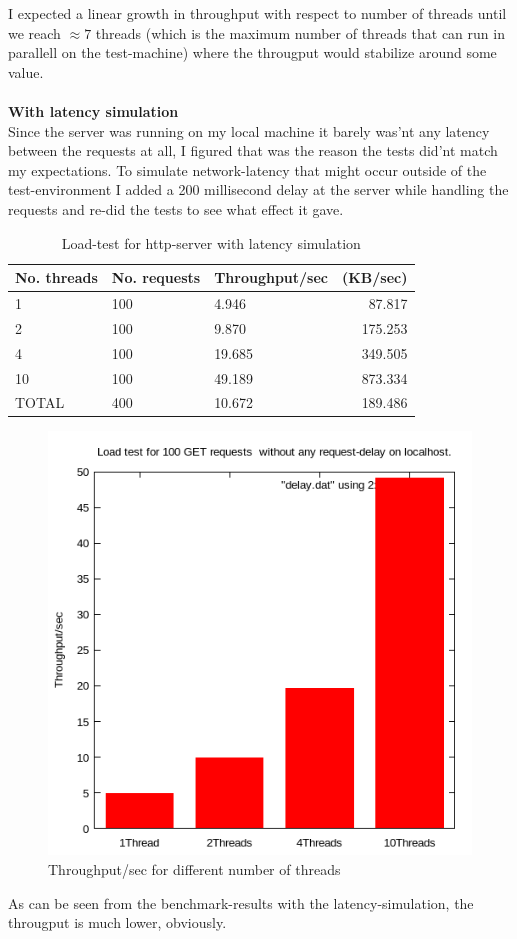 \documentclass[a4paper, 11pt]{article}
\begin{document}
I expected a linear growth in throughput with respect to number of threads until we reach $\approx 7$ threads (which is the maximum number of threads that can run in parallell on the test-machine) where the througput would stabilize around some value. \\ \\ 
\textbf{With latency simulation} \\ 
Since the server was running on my local machine it barely was'nt any latency between the requests at all, I figured that was the reason the tests did'nt match my expectations.
To simulate network-latency that might occur outside of the test-environment I added a 200 millisecond delay at the server while handling the requests and re-did the tests to see what  effect it gave.
\begin{table}[H]
\centering
\label{Load-test for http-server with latency simulation}
\begin{tabular}{|l|l|l|r|}
\hline
\textbf{No. threads}  & \textbf{No. requests}  & \textbf{Throughput/sec} & \textbf{(KB/sec)} \\ \hline
1 & 100 & 4.946 & 87.817 \\ \hline
2 & 100 & 9.870 & 175.253 \\ \hline
4 & 100 & 19.685 & 349.505 \\ \hline
10 & 100 & 49.189 & 873.334 \\ \hline
TOTAL & 400 & 10.672 & 189.486 \\ \hline
\end{tabular}
\caption{Load-test for http-server with latency simulation}
\end{table}
\begin{figure}[H]
\includegraphics[scale=0.7]{delay.png}
\caption{Throughput/sec for different number of threads}
\end{figure}
As can be seen from the benchmark-results with the latency-simulation, the througput is much lower, obviously.
\end{document}
